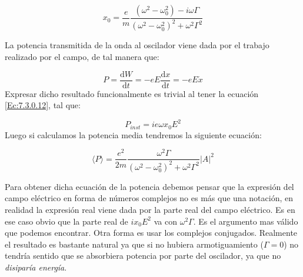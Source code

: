 \documentclass[12pt,a4paper]{article}
\newcommand{\D}{\mathrm{d}}
\numberwithin{equation}{section}
\numberwithin{figure}{section}
\begin{document}
\begin{equation}
x_0 = \dfrac{e}{m} \dfrac{( \omega^2 - \omega_0^2)-i \omega \Gamma}{(\omega^2-\omega_0^2)^2 + \omega^2 \Gamma^2}
\end{equation}

La potencia transmitida de la onda al oscilador viene dada por el trabajo realizado por el campo, de tal manera que:

\begin{equation}
P = \dfrac{\D W}{\D t} = -  e E  \dfrac{\D x}{\D t} = - e E \dot{x}
\end{equation} 
Expresar dicho resultado funcionalmente es trivial al tener la ecuación \ref{Ec:7.3.0.12}, tal que:

\begin{equation}
P_{inst} = i e \omega x_0  E^2 
\end{equation}
Luego si calculamos la potencia media tendremos la siguiente ecuación:





\begin{equation}
\langle P \rangle = \dfrac{e^2}{2m} \dfrac{\omega^2 \Gamma}{(\omega^2 - \omega_0^2)^2 + \omega^2 \Gamma^2} |A|^2 
\end{equation}

Para obtener dicha ecuación de la potencia debemos pensar que la expresión del campo eléctrico en forma de números complejos no es más que una notación, en realidad la expresión real viene dada por la parte real del campo eléctrico. Es en ese caso obvio que la parte real de $ix_0E^2$ va con $\omega^2 \Gamma$. Es el argumento mas válido que podemos encontrar. Otra forma es usar los complejos conjugados. Realmente el resultado es bastante natural ya que si no hubiera armotiguamiento ($\Gamma = 0$) no tendría sentido que se absorbiera potencia por parte del oscilador, ya que no \textit{disiparía energía}. \\
\end{document}
